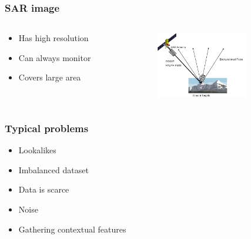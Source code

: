 \documentclass{beamer}
\begin{document}
\begin{frame}
\frametitle{SAR image}

	\begin{columns}[T]
    	\begin{column}{.5\textwidth}

			\begin{itemize}
				\item Has high resolution
				\item Can always monitor
				\item Covers large area 

			\end{itemize}
		\end{column}
		\begin{column}{.5\textwidth}
			\begin{figure}
				\centering
   				\includegraphics[width=40mm,scale=1]{./img/SARexplained.png}
			\end{figure}
		\end{column}
	\end{columns}

\end{frame}


\begin{frame}
\frametitle{Typical problems}

	\begin{itemize}
		\item Lookalikes
		\item Imbalanced dataset
		\item Data is scarce
		\item Noise
		\item Gathering contextual features
	\end{itemize}
	
\end{frame}

\end{document}
